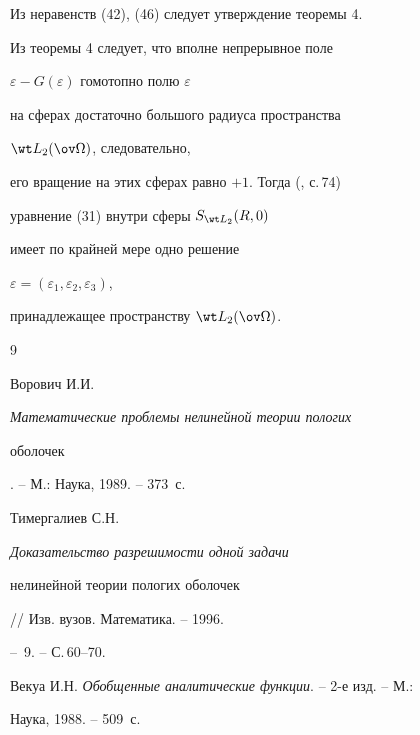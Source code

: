 Из неравенств (42), (46) следует утверждение теоремы 4. 


 


Из теоремы 4 следует, что вполне непрерывное поле 


$\varepsilon-G(\varepsilon)$ гомотопно полю $\varepsilon$ 


на сферах достаточно большого радиуса пространства 


$\wt L_2(\ov\Omega)$, следовательно, 


его вращение на этих сферах равно $+1$. Тогда (\cite{1}, с.\,74) 


уравнение (31) внутри сферы $S_{\wt L_2}(R,0)$ 


имеет по крайней мере одно решение 


$\varepsilon=(\varepsilon_1,\varepsilon_2,\varepsilon_3)$, 


принадлежащее пространству $\wt L_2(\ov\Omega)$. 


 


 


\begin{thebibliography}{9} 


 




Ворович И.И. {\em Математические проблемы нелинейной теории пологих 


оболочек}. -- М.: Наука, 1989. -- 373~с. 




Тимергалиев С.Н. {\em Доказательство разрешимости одной задачи 


нелинейной теории пологих оболочек} // Изв. вузов. Математика. -- 1996. 


-- \No\,9. -- С.\,60--70. 




Векуа И.Н. {\em Обобщенные аналитические функции}. -- 2-е изд. -- М.: 


Наука, 1988. -- 509~с. 


 


 


\end{thebibliography} 


 


\vskip 2cm 


 








\smallskip 




 


 


\label{end} 


 


